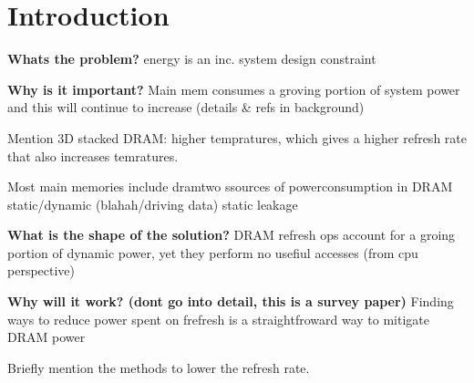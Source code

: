 \section{Introduction}
\label{sec:int}
\textbf{Whats the problem?}
energy is an inc. system design constraint

\textbf{Why is it important?}
Main mem consumes a groving portion of system power and this will continue to increase (details \& refs in background)

Mention 3D stacked DRAM: higher tempratures, which gives a higher refresh rate that also increases temratures.

Most main memories include dramtwo ssources of powerconsumption in DRAM static/dynamic (blahah/driving data)
static leakage

\textbf{What is the shape of the solution?}
DRAM refresh ops account for a groing portion of dynamic power, yet they perform no usefiul accesses (from cpu perspective)

\textbf{Why will it work? (dont go into detail, this is a survey paper)}
Finding ways to reduce power spent on frefresh is a straightfroward way to mitigate DRAM power

Briefly mention the methods to lower the refresh rate.